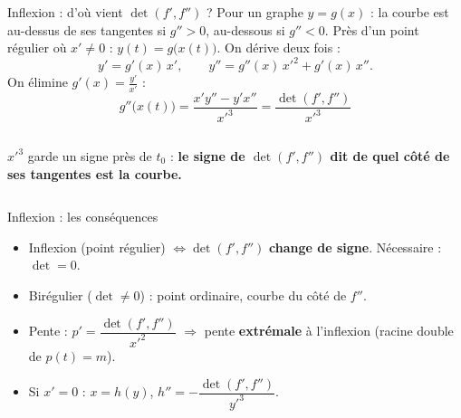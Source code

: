 \documentclass[aspectratio=169,11pt]{beamer}
\begin{document}
\begin{frame}{Inflexion : d'où vient $\det(f',f'')$ ?}
Pour un graphe $y=g(x)$ : la courbe est au-dessus de ses tangentes si $g''>0$, au-dessous si $g''<0$.
\pause
Près d'un point régulier où $x'\neq0$ : $y(t)=g\big(x(t)\big)$. On dérive deux fois :
\[y'=g'(x)\,x',\qquad y''=g''(x)\,x'^2+g'(x)\,x''.\]
\pause
On élimine $g'(x)=\frac{y'}{x'}$ :
\[\boxed{\ g''\big(x(t)\big)=\frac{x'y''-y'x''}{x'^3}=\frac{\det(f',f'')}{x'^3}\ }\]
\pause
\begin{columns}[c]
$x'^3$ garde un signe près de $t_0$ : \textbf{le signe de $\det(f',f'')$ dit de quel côté de ses tangentes est la courbe.}
\centering{}
\end{columns}
\end{frame}

\begin{frame}{Inflexion : les conséquences}
\begin{FORM}
\begin{itemize}
\item Inflexion (point régulier) $\iff\det(f',f'')$ \textbf{change de signe}. Nécessaire : $\det=0$.
\item Birégulier ($\det\neq0$) : point ordinaire, courbe du côté de $f''$.
\item Pente : $p'=\dfrac{\det(f',f'')}{x'^2}$ $\Rightarrow$ pente \textbf{extrémale} à l'inflexion (racine double de $p(t)=m$).
\item Si $x'=0$ : $x=h(y)$, $h''=-\dfrac{\det(f',f'')}{y'^3}$.
\end{itemize}
\end{FORM}
\end{frame}
\end{document}
